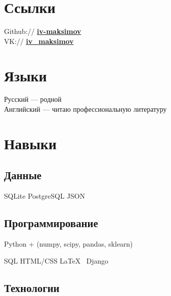 \documentclass[a4paper]{resume}
\begin{document}
\begin{minipage}[t]{0.35\textwidth} {\Large }
\sectionspace



\section{Ссылки} 

Github:// \href{https://github.com/iv-maksimov}{\bf iv-maksimov} \\
VK:// \href{http://vk.com/iv\_maksimov}{\bf iv\_maksimov}

\sectionspace 


\section{Языки}
Русский — родной \\
Английский — читаю профессиональную литературу



\sectionspace 


\section{Навыки}

\subsection{Данные}
SQLite \textbullet{} PostgreSQL \textbullet {}JSON
\sectionspace

\subsection{Программирование}

Python + (numpy, scipy, pandas, sklearn)

SQL \textbullet{} HTML/CSS \textbullet{} \LaTeX\ \textbullet{} Django

\sectionspace

\subsection{Технологии}


\end{minipage}
\end{document}
